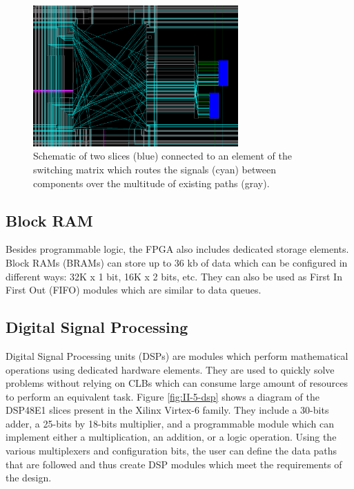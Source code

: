      \begin{figure}[h!]
        \centering
        \includegraphics[width=0.7\textwidth]{img/II-5-irradiation/switch.png}
        \caption{Schematic of two slices (blue) connected to an element of the switching matrix which routes the signals (cyan) between components over the multitude of existing paths (gray).}
        \label{fig:II-5-switch}
      \end{figure}

    \subsection{Block RAM}

      Besides programmable logic, the FPGA also includes dedicated storage elements. Block RAMs (BRAMs) \cite{VIRTEX-RAM} can store up to 36 kb of data which can be configured in different ways: 32K x 1 bit, 16K x 2 bits, etc. They can also be used as First In First Out (FIFO) modules which are similar to data queues.

    \subsection{Digital Signal Processing}

      Digital Signal Processing units (DSPs) \cite{VIRTEX-DSP} are modules which perform mathematical operations using dedicated hardware elements. They are used to quickly solve problems without relying on CLBs which can consume large amount of resources to perform an equivalent task. Figure \ref{fig:II-5-dsp} shows a diagram of the DSP48E1 slices present in the Xilinx Virtex-6 family. They include a 30-bits adder, a 25-bits by 18-bits multiplier, and a programmable module which can implement either a multiplication, an addition, or a logic operation. Using the various multiplexers and configuration bits, the user can define the data paths that are followed and thus create DSP modules which meet the requirements of the design.

